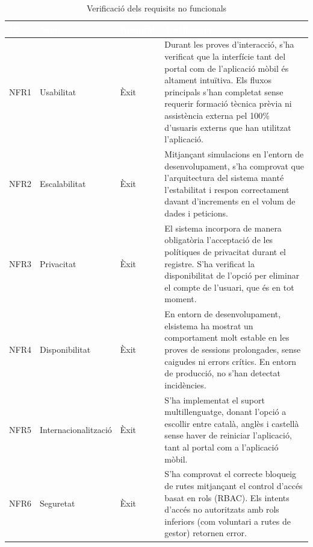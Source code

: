 \documentclass[11pt,a4paper]{report}
\begin{document}
\begin{table}[H]
\centering
\label{tab:verificacio_rnf}
    \begin{small}
    \renewcommand{\arraystretch}{1.1}
        \begin{tabular}{|p{1.2cm}|p{2.2cm}|p{1.8cm}|p{8.9cm}|}
        \hline
        \rowcolor{oceanblue}\textcolor{white}{\textbf{ID}} & \textcolor{white}{\textbf{Nom}} & \textcolor{white}{\textbf{Resultat}} & \textcolor{white}{\textbf{Justificació}} \\ \hline
        NFR1 & Usabilitat & Èxit & Durant les proves d'interacció, s'ha verificat que la interfície tant del portal com de l'aplicació mòbil és altament intuïtiva. Els fluxos principals s'han completat sense requerir formació tècnica prèvia ni assistència externa pel 100\% d'usuaris externs que han utilitzat l'aplicació. \\ \hline
        NFR2 & Escalabilitat & Èxit & Mitjançant simulacions en l'entorn de desenvolupament, s'ha comprovat que l'arquitectura del sistema manté l'estabilitat i respon correctament davant d'increments en el volum de dades i peticions. \\ \hline
        NFR3 & Privacitat & Èxit & El sistema incorpora de manera obligatòria l'acceptació de les polítiques de privacitat durant el registre. S'ha verificat la disponibilitat de l'opció per eliminar el compte de l'usuari, que és en tot moment. \\ \hline
        NFR4 & Disponibilitat & Èxit & En entorn de desenvolupament, elsistema ha mostrat un comportament molt estable en les proves de sessions prolongades, sense caigudes ni errors crítics. En entorn de producció, no s'han detectat incidències. \\ \hline
        NFR5 & Internacio\-nalització & Èxit & S'ha implementat el suport multillenguatge, donant l'opció a escollir entre català, anglès i castellà sense haver de reiniciar l'aplicació, tant al portal com a l'aplicació mòbil. \\ \hline
        NFR6 & Seguretat & Èxit & S'ha comprovat el correcte bloqueig de rutes mitjançant el control d'accés basat en rols (RBAC). Els intents d'accés no autoritzats amb rols inferiors (com voluntari a rutes de gestor) retornen error. \\ \hline
        \end{tabular}
    \end{small}
    \caption[Verificació dels requisits no funcionals]{Verificació dels requisits no funcionals}
\end{table}
\newpage
\end{document}
